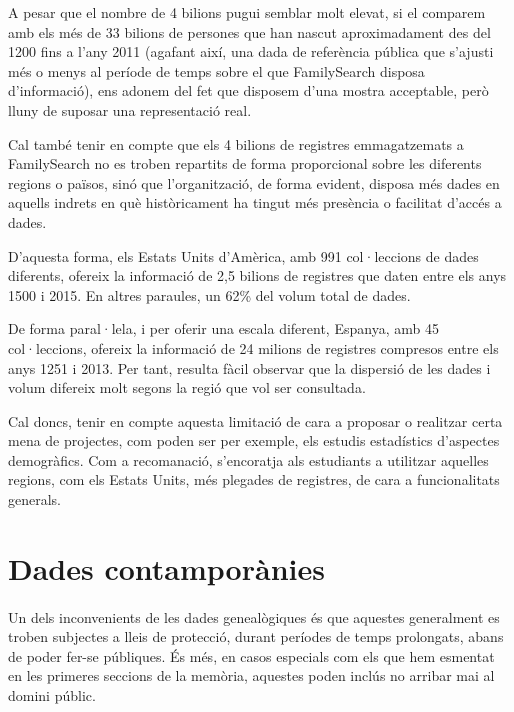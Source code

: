     A pesar que el nombre de 4 bilions pugui semblar molt elevat, si el comparem amb els més de 33 bilions de persones que han nascut aproximadament des del 1200 fins a l'any 2011 (agafant així, una dada de referència pública que s'ajusti més o menys al període de temps sobre el que FamilySearch disposa d'informació), ens adonem del fet que disposem d'una mostra acceptable, però lluny de suposar una representació real.

    Cal també tenir en compte que els 4 bilions de registres emmagatzemats a FamilySearch no es troben repartits de forma proporcional sobre les diferents regions o països, sinó que l'organització, de forma evident, disposa més dades en aquells indrets en què històricament ha tingut més presència o facilitat d'accés a dades.

     D'aquesta forma, els Estats Units d'Amèrica, amb 991 col·leccions de dades diferents, ofereix la informació de 2,5 bilions de registres que daten entre els anys 1500 i 2015. En altres paraules, un 62\% del volum total de dades.

     De forma paral·lela, i per oferir una escala diferent, Espanya, amb 45 col·leccions, ofereix la informació de 24 milions de registres compresos entre els anys 1251 i 2013. Per tant, resulta fàcil observar que la dispersió de les dades i volum difereix molt segons la regió que vol ser consultada.

     Cal doncs, tenir en compte aquesta limitació de cara a proposar o realitzar certa mena de projectes, com poden ser per exemple, els estudis estadístics d'aspectes demogràfics. Com a recomanació, s'encoratja als estudiants a utilitzar aquelles regions, com els Estats Units, més plegades de registres, de cara a funcionalitats generals.


 \section{Dades contamporànies}

    \paragraph{}
    Un dels inconvenients de les dades genealògiques és que aquestes generalment es troben subjectes a lleis de protecció, durant períodes de temps prolongats, abans de poder fer-se públiques. És més, en casos especials com els que hem esmentat en les primeres seccions de la memòria, aquestes poden inclús no arribar mai al domini públic.

